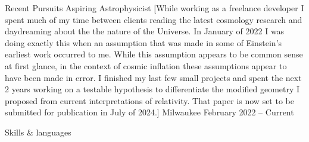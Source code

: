 \documentclass[compact]{llresume}
\begin{document}
\begin{mainpane}
    \begin{mainsection}{Recent Pursuits}
    \entryJob
            {Aspiring Astrophysicist}
            [While working as a freelance developer I spent much of my time between clients reading the latest cosmology research and daydreaming about the the nature of the Universe. 
            In January of 2022 I was doing exactly this when an assumption that was made in some of Einstein's earliest work occurred to me. While this assumption appears to be common sense at first glance, in the context of cosmic inflation these assumptions appear to have been made in error. I finished my last few small projects and spent the next 2 years working on a testable hypothesis to differentiate the modified geometry I proposed from current interpretations of relativity. That paper is now set to be submitted for publication in July of 2024.]
            {Milwaukee}
            {February 2022 -- Current}
    \end{mainsection}


    \begin{mainsection}{Skills \& languages}

    \end{mainsection}

\end{mainpane}
\end{document}
